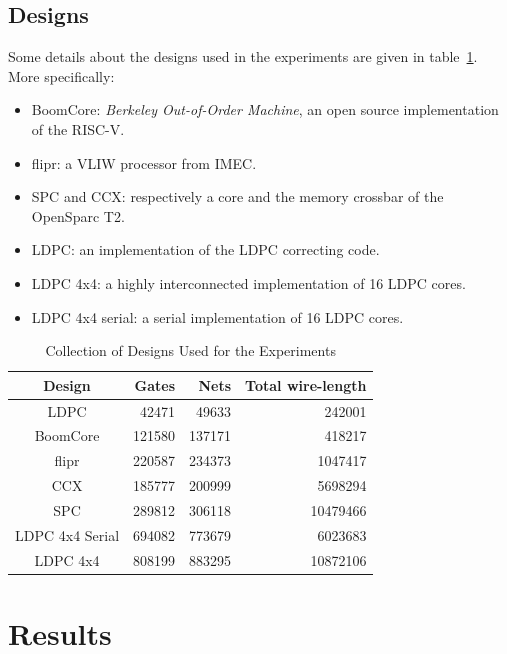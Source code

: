 \documentclass[conference]{IEEEtran}
\begin{document}
\subsection{Designs}
Some details about the designs used in the experiments are given in table~\ref{tab:designs}.
More specifically:
\begin{itemize}
    \item BoomCore: \textit{Berkeley Out-of-Order Machine}, an open source implementation of the RISC-V.
    \item flipr: a VLIW processor from IMEC.
    \item SPC and CCX: respectively a core and the memory crossbar of the OpenSparc T2.
    \item LDPC: an implementation of the LDPC correcting code.
    \item LDPC 4x4: a highly interconnected implementation of 16 LDPC cores.
    \item LDPC 4x4 serial: a serial implementation of 16 LDPC cores.
\end{itemize}


\begin{table}[!t]
\renewcommand{\arraystretch}{1.3}
\caption{Collection of Designs Used for the Experiments}
\label{tab:designs}
\centering
\begin{tabular}{||c|r|r|r||}
\hline
Design & Gates & Nets & Total wire-length\\
\hline
\hline
LDPC & 42471 & 49633 & 242001\\
\hline
BoomCore & 121580 & 137171 & 418217\\
\hline
flipr & 220587 & 234373 & 1047417 \\
\hline
CCX & 185777 & 200999 & 5698294\\
\hline
SPC & 289812 & 306118 & 10479466\\
\hline
LDPC 4x4 Serial & 694082 & 773679 & 6023683\\
\hline
LDPC 4x4 & 808199 & 883295 & 10872106\\
\hline
\end{tabular}
\end{table}


\section{Results}\label{sec:res}
\end{document}
